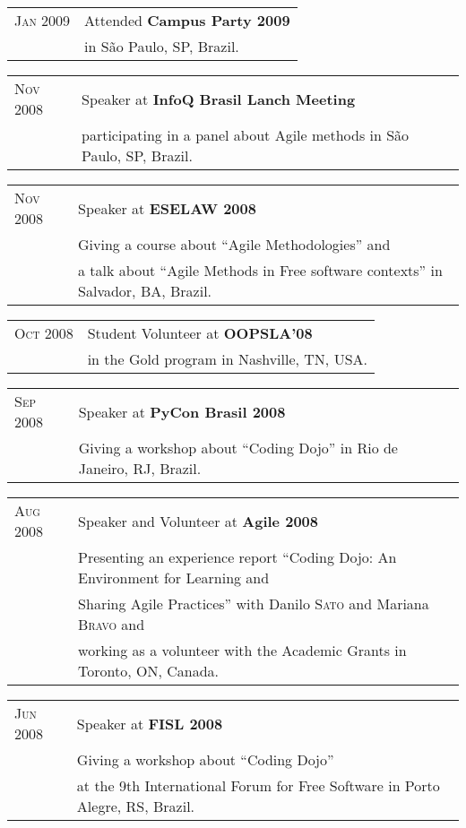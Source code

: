\documentclass[letter,10pt]{article}
\begin{document}
\begin{tabular}{p{2.5cm}l}
  \textsc{Jan 2009} & Attended \textbf{Campus Party 2009}\\
  &in São Paulo, SP, Brazil.\\
\end{tabular}

\begin{tabular}{p{2.5cm}l}
  \textsc{Nov 2008} & Speaker at \textbf{InfoQ Brasil Lanch Meeting}\\
  & participating in a panel about Agile methods in São Paulo, SP, Brazil.\\
\end{tabular}

\begin{tabular}{p{2.5cm}l}
  \textsc{Nov 2008} & Speaker at \textbf{ESELAW 2008}\\
  &Giving a course about ``Agile Methodologies'' and\\
  &a talk about ``Agile Methods in Free software contexts'' in Salvador, BA, Brazil.\\
\end{tabular}

\begin{tabular}{p{2.5cm}l}
  \textsc{Oct 2008} & Student Volunteer at \textbf{OOPSLA'08}\\
  & in the Gold program in Nashville, TN, USA.\\
\end{tabular}

\begin{tabular}{p{2.5cm}l}
  \textsc{Sep 2008} & Speaker at \textbf{PyCon Brasil 2008}\\
  &Giving a workshop about ``Coding Dojo'' in Rio de Janeiro, RJ, Brazil.\\
\end{tabular}

\begin{tabular}{p{2.5cm}l}
  \textsc{Aug 2008} & Speaker and Volunteer at \textbf{Agile 2008}\\
  &Presenting an experience report ``Coding Dojo: An Environment for
  Learning and\\
  & Sharing Agile Practices'' with Danilo \textsc{Sato} and Mariana \textsc{Bravo} and\\
  & working as a volunteer with the Academic Grants in Toronto, ON, Canada.\\
\end{tabular}

\begin{tabular}{p{2.5cm}l}
  \textsc{Jun 2008} & Speaker at \textbf{FISL 2008}\\
  &Giving a workshop about ``Coding Dojo''\\
  & at the 9th International Forum for Free Software in Porto
  Alegre, RS, Brazil.\\
\end{tabular}
\end{document}
